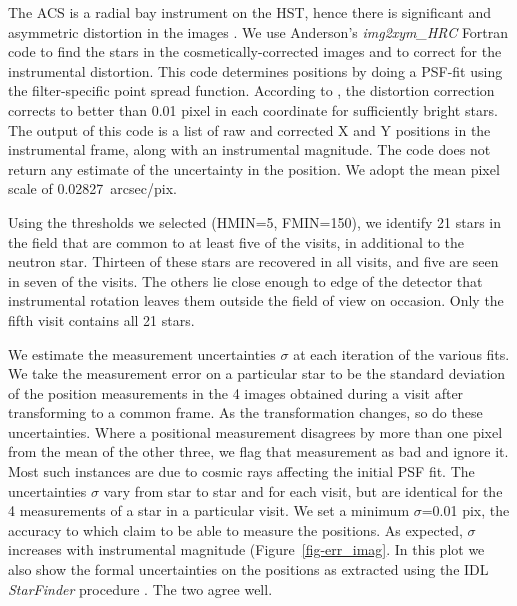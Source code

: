 \documentclass[12pt,preprint]{aastex}
\begin{document}
The ACS is a radial bay instrument on the HST, hence there is significant and
asymmetric distortion in the images \citep{AK04}. We use
Anderson's {\it img2xym\_HRC} Fortran code to find the stars in the
cosmetically-corrected images and to correct for the instrumental distortion.
This code determines positions by doing a PSF-fit using the filter-specific
point spread function.
According to \citet{AK04}, the distortion correction corrects to better
than 0.01 pixel in each coordinate for sufficiently bright stars.
The output of this code is a list of raw and corrected X and Y positions in 
the instrumental frame, along with an instrumental magnitude.
The code does not return any estimate of the
uncertainty in the position. We adopt the mean pixel scale of
0.02827~arcsec/pix.

Using the thresholds we selected (HMIN=5, FMIN=150),
we identify 21 stars in the field that are
common to at least five of the visits, in additional to the neutron star.
Thirteen of these stars are recovered
in all visits, and five are seen in seven of the visits.
The others lie close enough to edge of the detector that 
instrumental rotation leaves them outside the field of view on occasion.
Only the fifth visit contains all 21 stars.

We estimate the measurement uncertainties $\sigma$
at each iteration of the various fits.
We take the measurement error on a particular star to be the
standard deviation of the position measurements in the 4 images obtained during
a visit after transforming to a common frame.
As the transformation changes, so do these uncertainties.
Where a positional measurement disagrees by more than one pixel from the
mean of the other three, we flag that measurement as bad and ignore it. Most
such instances are due to cosmic rays affecting the initial PSF fit.
The uncertainties $\sigma$ vary from star to star and for each visit, but 
are identical for the 4 measurements of a star in a particular visit.
We set a minimum $\sigma$=0.01 pix, the accuracy to which \citet{AK04}
claim to be able to measure the positions.
As expected, $\sigma$ increases with instrumental magnitude
(Figure~\ref{fig-err_imag}. In this plot we also show the formal uncertainties
on the positions as extracted using the IDL {\it StarFinder} procedure
\citep{DB00}.
The two agree well.
\end{document}
